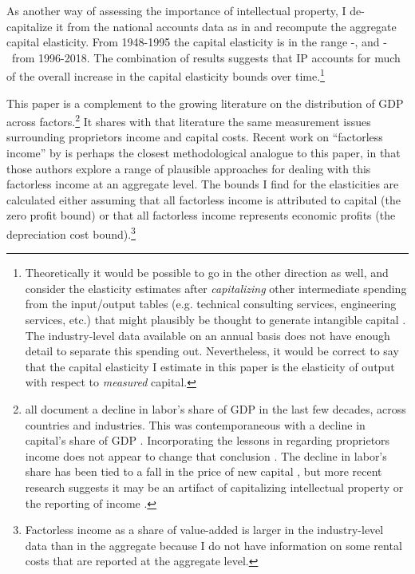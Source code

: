 \documentclass[11pt]{article}
\begin{document}
As another way of assessing the importance of intellectual property, I de-capitalize it from the national accounts data as in \cite{ksz2020} and recompute the aggregate capital elasticity. From 1948-1995 the capital elasticity is in the range \noipearlydepr-\noipearlynoprofit, and \noiplatedepr-\noiplatenoprofit \ from 1996-2018. The combination of results suggests that IP accounts for much of the overall increase in the capital elasticity bounds over time.\footnote{Theoretically it would be possible to go in the other direction as well, and consider the elasticity estimates after \textit{capitalizing} other intermediate spending from the input/output tables (e.g. technical consulting services, engineering services, etc.) that might plausibly be thought to generate intangible capital \citep{chs2009,mp2010,MCGRATTAN2020S147}. The industry-level data available on an annual basis does not have enough detail to separate this spending out. Nevertheless, it would be correct to say that the capital elasticity I estimate in this paper is the elasticity of output with respect to \textit{measured} capital.} 

This paper is a complement to the growing literature on the distribution of GDP across factors.\footnote{\cite{azmat2012,bentolilaSP2003,estrada2014,harrison2005,jt2007,guscina2006,kn2014,daoetal2017} all document a decline in labor's share of GDP in the last few decades, across countries and industries. This was contemporaneous with a decline in capital's share of GDP \citep{Barkai000,rognlie2015}. Incorporating the lessons in \cite{Gollin:2002zr} regarding proprietors income does not appear to change that conclusion \citep{gommerupert2004,elsbyhs2013}. The decline in labor's share has been tied to a fall in the price of new capital \citep{kn2014}, but more recent research suggests it may be an artifact of capitalizing intellectual property \citep{ksz2020} or the reporting of income \citep{syzz2019}.} It shares with that literature the same measurement issues surrounding proprietors income and capital costs. Recent work on ``factorless income'' by \cite{kn2019} is perhaps the closest methodological analogue to this paper, in that those authors explore a range of plausible approaches for dealing with this factorless income at an aggregate level. The bounds I find for the elasticities are calculated either assuming that all factorless income is attributed to capital (the zero profit bound) or that all factorless income represents economic profits (the depreciation cost bound).\footnote{Factorless income as a share of value-added is larger in the industry-level data than in the aggregate because I do not have information on some rental costs that are reported at the aggregate level.} 
\end{document}
